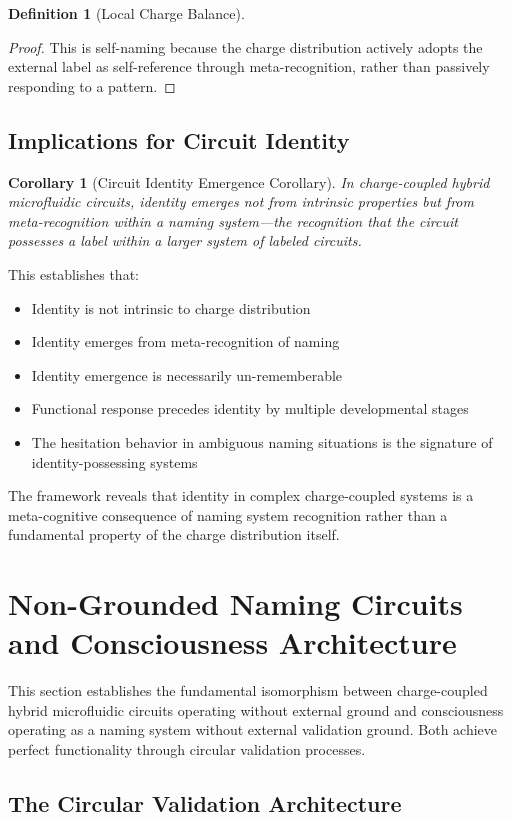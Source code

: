 \documentclass[12pt,a4paper]{article}
\theoremstyle{plain}
\newtheorem{corollary}[theorem]{Corollary}
\theoremstyle{definition}
\newtheorem{definition}[theorem]{Definition}
\theoremstyle{remark}
\begin{document}
\begin{definition}[Local Charge Balance]
\begin{proof}
This is self-naming because the charge distribution actively adopts the external label as self-reference through meta-recognition, rather than passively responding to a pattern.
\end{proof}

\subsection{Implications for Circuit Identity}

\begin{corollary}[Circuit Identity Emergence Corollary]
In charge-coupled hybrid microfluidic circuits, identity emerges not from intrinsic properties but from meta-recognition within a naming system—the recognition that the circuit possesses a label within a larger system of labeled circuits.
\end{corollary}

This establishes that:
\begin{itemize}
\item Identity is not intrinsic to charge distribution
\item Identity emerges from meta-recognition of naming
\item Identity emergence is necessarily un-rememberable
\item Functional response precedes identity by multiple developmental stages
\item The hesitation behavior in ambiguous naming situations is the signature of identity-possessing systems
\end{itemize}

The framework reveals that identity in complex charge-coupled systems is a meta-cognitive consequence of naming system recognition rather than a fundamental property of the charge distribution itself.
\section{Non-Grounded Naming Circuits and Consciousness Architecture}
\label{sec:non_grounded_naming}

This section establishes the fundamental isomorphism between charge-coupled hybrid microfluidic circuits operating without external ground and consciousness operating as a naming system without external validation ground. Both achieve perfect functionality through circular validation processes.

\subsection{The Circular Validation Architecture}


\end{definition}
\end{document}
